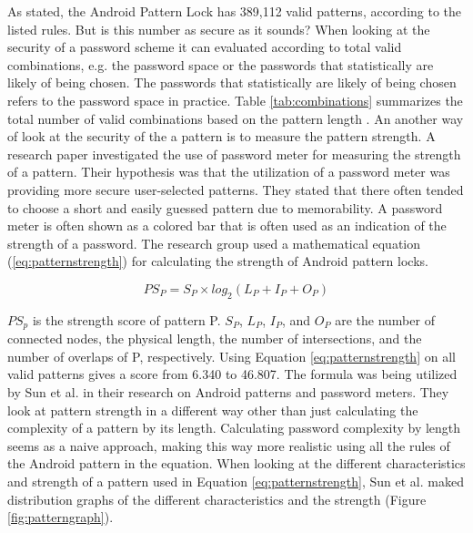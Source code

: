   As stated, the Android Pattern Lock has 389,112 valid patterns, according to the listed rules. But is this number as secure as it sounds? When looking at the security of a password scheme it can evaluated according to total valid combinations, e.g. the password space or the passwords that statistically are likely of being chosen. The passwords that statistically are likely of being chosen refers to the password space in practice. Table \ref{tab:combinations} summarizes the total number of valid combinations based on the pattern length \cite{Sun}. An another way of look at the security of the a pattern is to measure the pattern strength. A research paper investigated the use of password meter for measuring the strength of a pattern. Their hypothesis was that the utilization of a password meter was providing more secure user-selected patterns. They stated that there often tended to choose a short and easily guessed pattern due to memorability. A password meter is often shown as a colored bar that is often used as an indication of the strength of a password. The research group used a mathematical equation (\ref{eq:patternstrength}) for calculating the strength of Android pattern locks. 

    \begin{equation}\label{eq:patternstrength}
      PS_{P} = S_{P} \times log_{2}(L_{P} + I_{P} + O_{P})
    \end{equation}

  $PS_{p}$ is the strength score of pattern P. $S_{P}$, $L_{P}$, $I_{P}$, and $O_{P}$ are the number of connected nodes, the physical length, the number of intersections, and the number of overlaps of P, respectively. Using Equation \ref{eq:patternstrength} on all valid patterns gives a score from 6.340 to 46.807. The formula was being utilized by Sun et al. \cite{Sun} in their research on Android patterns and password meters. They look at pattern strength in a different way other than just calculating the complexity of a pattern by its length. Calculating password complexity by length seems as a naive approach, making this way more realistic using all the rules of the Android pattern in the equation. When looking at the different characteristics and strength of a pattern used in Equation \ref{eq:patternstrength}, Sun et al. maked distribution graphs of the different characteristics and the strength (Figure \ref{fig:patterngraph}).

